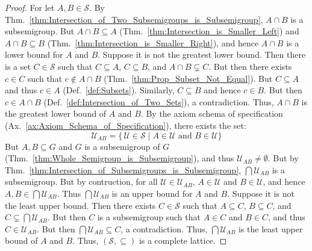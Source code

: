         \begin{proof}
            For let $A,B\in\mathcal{S}$. By
            Thm.~\ref{thm:Intersection_of_Two_Subsemigroups_is_Subsemigroup},
            $A\cap{B}$ is a subsemigroup. But $A\cap{B}\subseteq{A}$
            (Thm.~\ref{thm:Intersection_is_Smaller_Left}) and
            $A\cap{B}\subseteq{B}$
            (Thm.~\ref{thm:Intersection_is_Smaller_Right}), and hence
            $A\cap{B}$ is a lower bound for $A$ and $B$. Suppose it is not the
            greatest lower bound. Then there is a set $C\in\mathcal{S}$ such
            that $C\subseteq{A}$, $C\subseteq{B}$, and $A\cap{B}\subsetneq{C}$.
            But then there exists $c\in{C}$ such that $c\notin{A}\cap{B}$
            (Thm.~\ref{thm:Prop_Subset_Not_Equal}). But $C\subseteq{A}$ and thus
            $c\in{A}$ (Def.~\ref{def:Subsets}). Similarly, $C\subseteq{B}$ and
            hence $c\in{B}$. But then $c\in{A}\cap{B}$
            (Def.~\ref{def:Intersection_of_Two_Sets}), a contradiction. Thus,
            $A\cap{B}$ is the greatest lower bound of $A$ and $B$. By the
            axiom schema of specification
            (Ax.~\ref{ax:Axiom_Schema_of_Specification}), there exists the set:
            \begin{equation}
                \mathcal{U}_{AB}=\{\,\mathcal{U}\in\mathcal{S}\;|\;
                    A\in\mathcal{U}\textrm{ and }B\in\mathcal{U}\}
            \end{equation}
            But $A,B\subseteq{G}$ and $G$ is a subsemigroup of $G$
            (Thm.~\ref{thm:Whole_Semigroup_is_Subsemigroup}), and thus
            $\mathcal{U}_{AB}\ne\emptyset$. But by
            Thm.~\ref{thm:Intersection_of_Subsemigroups_is_Subsemigroup},
            $\bigcap\mathcal{U}_{AB}$ is a subsemigroup. But by contruction, for
            all $\mathcal{U}\in\mathcal{U}_{AB}$, $A\in\mathcal{U}$ and
            $B\in\mathcal{U}$, and hence $A,B\in\bigcap\mathcal{U}_{AB}$.
            Thus $\bigcap\mathcal{U}_{AB}$ is an upper bound for $A$ and $B$.
            Suppose it is not the least upper bound. Then there exists
            $C\in\mathcal{S}$ such that $A\subseteq{C}$, $B\subseteq{C}$, and
            $C\subsetneq\bigcap\mathcal{U}_{AB}$. But then $C$ is a subsemigroup
            such that $A\in{C}$ and $B\in{C}$, and thus $C\in\mathcal{U}_{AB}$.
            But then $\bigcap\mathcal{U}_{AB}\subseteq{C}$, a contradiction.
            Thus, $\bigcap\mathcal{U}_{AB}$ is the least upper bound of $A$ and
            $B$. Thus, $(\mathcal{S},\subseteq)$ is a complete lattice.
        \end{proof}
